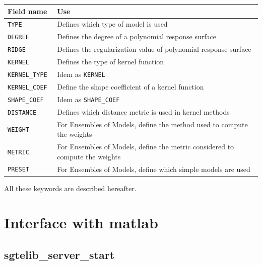 \documentclass[12pt]{article}
\begin{document}
      \begin{center}
        \begin{tabular}{|l|p{8cm}|}
          \hline
          Field name & Use \\
          \hline\hline
          {\tt TYPE} & Defines which type of model is used \\\hline
          {\tt DEGREE}  & Defines the degree of a polynomial response surface \\\hline
          {\tt RIDGE } & Defines the regularization value of polynomial response surface \\\hline
          {\tt KERNEL } & Defines the type of kernel function \\\hline
          {\tt KERNEL\_TYPE } & Idem as {\tt KERNEL } \\\hline
          {\tt KERNEL\_COEF} & Define the shape coefficient of a kernel function \\\hline
          {\tt SHAPE\_COEF }& Idem as {\tt SHAPE\_COEF } \\\hline
          {\tt DISTANCE} & Defines which distance metric is used in kernel methods\\\hline
          \hline
          {\tt WEIGHT }& For Ensembles of Models, define the method used to compute the weights \\\hline
          {\tt METRIC }& For Ensembles of Models, define the metric considered to compute the weights \\\hline
          {\tt PRESET} & For Ensembles of Models, define which simple models are used  \\\hline
        \end{tabular}
      \end{center}

  All these keywords are described hereafter.



\section{Interface with matlab}

\subsection{sgtelib\_server\_start}
\end{document}
